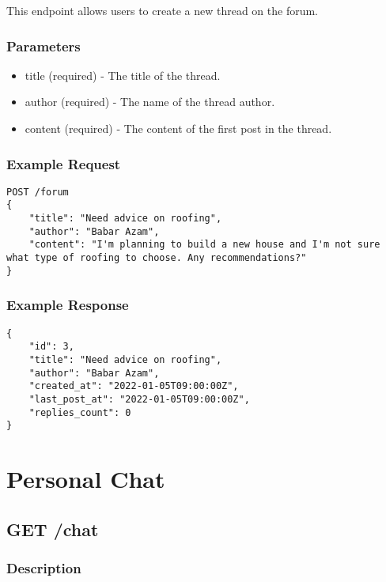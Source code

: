 \documentclass{article}
\begin{document}
This endpoint allows users to create a new thread on the forum.

\subsubsection{Parameters}

\begin{itemize}
\item title (required) - The title of the thread.
\item author (required) - The name of the thread author.
\item content (required) - The content of the first post in the thread.
\end{itemize}

\subsubsection{Example Request}

\begin{verbatim}
POST /forum
{
    "title": "Need advice on roofing",
    "author": "Babar Azam",
    "content": "I'm planning to build a new house and I'm not sure what type of roofing to choose. Any recommendations?"
}
\end{verbatim}

\subsubsection{Example Response}

\begin{verbatim}
{
    "id": 3,
    "title": "Need advice on roofing",
    "author": "Babar Azam",
    "created_at": "2022-01-05T09:00:00Z",
    "last_post_at": "2022-01-05T09:00:00Z",
    "replies_count": 0
}
\end{verbatim}

\section{Personal Chat}

\subsection{GET /chat}

\subsubsection{Description}
\end{document}

